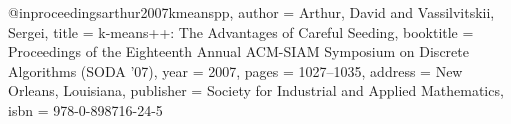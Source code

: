 @inproceedings{arthur2007kmeanspp,
  author    = {Arthur, David and Vassilvitskii, Sergei},
  title     = {k-means++: The Advantages of Careful Seeding},
  booktitle = {Proceedings of the Eighteenth Annual ACM-SIAM Symposium on Discrete Algorithms (SODA '07)},
  year      = {2007},
  pages     = {1027--1035},
  address   = {New Orleans, Louisiana},
  publisher = {Society for Industrial and Applied Mathematics},
  isbn      = {978-0-898716-24-5}
}